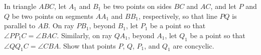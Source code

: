 In triangle $ABC$, let $A_1$ and $B_1$ be two points on sides $BC$ and $AC$, and let $P$ and $Q$ be two points on segments $AA_1$ and $BB_1$, respectively, so that line $PQ$ is parallel to $AB$. On ray $PB_1$, beyond $B_1$, let $P_1$ be a point so that $\angle PP_1C = \angle BAC$. Similarly, on ray $QA_1$, beyond $A_1$, let $Q_1$ be a point so that $\angle QQ_1C = \angle CBA$. Show that points $P$, $Q$, $P_1$, and $Q_1$ are concyclic.
